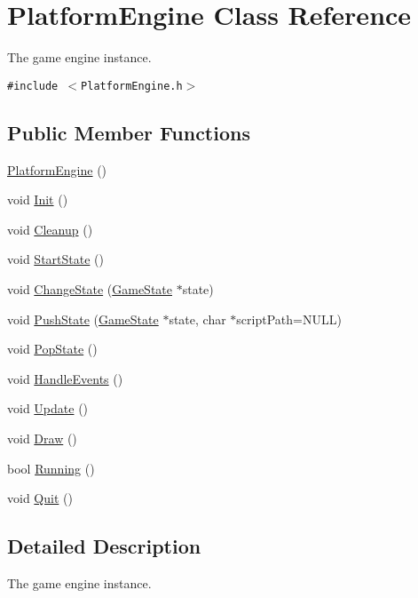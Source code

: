 \hypertarget{class_platform_engine}{
\section{PlatformEngine Class Reference}
\label{db/da1/class_platform_engine}
}
The game engine instance.  


{\tt \#include $<$PlatformEngine.h$>$}

\subsection*{Public Member Functions}
\begin{CompactItemize}
\item 
\hyperlink{class_platform_engine_9d45e2da5a9b7e52d8c5636f70068e11}{PlatformEngine} ()
\item 
void \hyperlink{class_platform_engine_059814bb3f1815b15d5a892f8ea6cb4a}{Init} ()
\item 
void \hyperlink{class_platform_engine_361b54312d9ec2fa842cd982f67100f9}{Cleanup} ()
\item 
void \hyperlink{class_platform_engine_8420fc9a24a0fed565af76f7bb378bdf}{StartState} ()
\item 
void \hyperlink{class_platform_engine_d2b335545c9ab6bce7be7c014bc8c528}{ChangeState} (\hyperlink{class_game_state}{GameState} $\ast$state)
\item 
void \hyperlink{class_platform_engine_0a2f800d7b8a54f2e3792bc99507c632}{PushState} (\hyperlink{class_game_state}{GameState} $\ast$state, char $\ast$scriptPath=NULL)
\item 
void \hyperlink{class_platform_engine_cf001abec596906465197d1220db2230}{PopState} ()
\item 
void \hyperlink{class_platform_engine_7fc47bff353292f1a1435d78664df36d}{HandleEvents} ()
\item 
void \hyperlink{class_platform_engine_d3ab75304226ad3fcac6b66ce3cedbc7}{Update} ()
\item 
void \hyperlink{class_platform_engine_cd756d58f81c5e28efe98ae075367a5c}{Draw} ()
\item 
bool \hyperlink{class_platform_engine_31ec37c0222f4694cc3c0e819e143038}{Running} ()
\item 
void \hyperlink{class_platform_engine_dbcdd91813cabbe51bb2f86eb23e772a}{Quit} ()
\end{CompactItemize}


\subsection{Detailed Description}
The game engine instance. 

